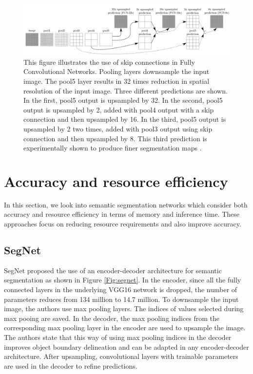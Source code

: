 	\begin{figure}[h]
		\centering
		\includegraphics[width=1\linewidth]{images/fcn_skip}
		\caption{This figure illustrates the use of skip connections in Fully Convolutional Networks. Pooling layers downsample the input image. The pool5 layer results in 32 times reduction in spatial resolution of the input image. Three different predictions are shown. In the first, pool5 output is upsampled by 32. In the second, pool5 output is upsampled by 2, added with pool4 output with a skip connection and then upsampled by 16. In the third, pool5 output is upsampled by 2 two times, added with pool3 output using skip connection and then upsampled by 8. This third prediction is experimentally shown to produce finer segmentation maps \cite{DBLP:journals/corr/LongSD14}.}
		\label{Fig:fcn}
	\end{figure}

\section{Accuracy and resource efficiency}
\label{section:acceff}

In this section, we look into semantic segmentation networks which consider both accuracy and resource efficiency in terms of memory and inference time. These approaches focus on reducing resource requirements and also improve accuracy.

\subsection{SegNet}

SegNet \cite{DBLP:journals/corr/BadrinarayananK15} proposed the use of an encoder-decoder architecture for semantic segmentation as shown in Figure \ref{Fig:segnet}. In the encoder, since all the fully connected layers in the underlying VGG16 network is dropped, the number of parameters reduces from 134 million to 14.7 million. To downsample the input image, the authors use max pooling layers. The indices of values selected during max pooing are saved. In the decoder, the max pooling indices from the corresponding max pooling layer in the encoder are used to upsample the image. The authors state that this way of using max pooling indices in the decoder improves object boundary delineation and can be adapted in any encoder-decoder architecture. After upsampling, convolutional layers with trainable parameters are used in the decoder to refine predictions. 

